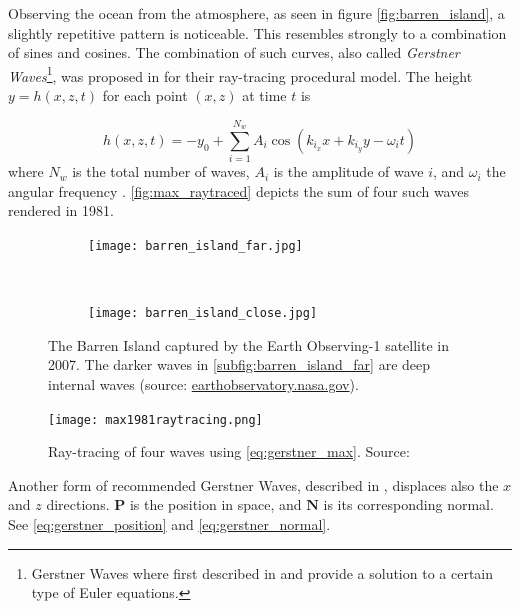 Observing the ocean from the atmosphere, as seen in figure
\autoref{fig:barren_island}, a slightly repetitive pattern is noticeable. This
resembles strongly to a combination of sines and cosines. The combination of
such curves, also called \textit{Gerstner Waves}\footnote{Gerstner Waves where
    first described in \autocite{gerstner1802theorie} and provide a solution to
a certain type of Euler equations.}, was proposed in
\autocite{max1981vectorized} for their ray-tracing procedural model. The height
$y = h(x,z,t)$ for each point $(x,z)$ at time $t$ is

\begin{equation}\label{eq:gerstner_max}
    h(x, z, t) = -y_0 + \sum_{i = 1}^{N_w} A_i \cos(k_{i_x}x + k_{i_y}y -
    \omega_i t)
\end{equation}
%
where $N_w$ is the total number of waves, $A_i$ is the amplitude of wave $i$,
and $\omega_i$ the angular frequency
\autocite{max1981vectorized,darles2011survey}. \autoref{fig:max_raytraced}
depicts the sum of four such waves rendered in 1981.

\begin{figure}[h!]
    \centering
    \begin{subfigure}[h]{\textwidth}
        \centering
        \texttt{[image: barren\_island\_far.jpg]}
        \label{subfig:barren_island_far}
    \end{subfigure}\\%
    \begin{subfigure}[h]{\textwidth}
        \centering
        \texttt{[image: barren\_island\_close.jpg]}
        \label{subfig:barren_island_close}
    \end{subfigure}
    \caption{The Barren Island captured by the Earth Observing-1 satellite in
        2007. The darker waves in \autoref{subfig:barren_island_far} are
        deep internal waves (source:
        \url{earthobservatory.nasa.gov}).}\label{fig:barren_island}
\end{figure}

\begin{figure}[h]
    \centering
    \texttt{[image: max1981raytracing.png]}
    \caption{Ray-tracing of four waves using \autoref{eq:gerstner_max}. Source:
    \autocite{max1981vectorized}}\label{fig:max_raytraced}
\end{figure}

Another form of recommended Gerstner Waves, described in
\autocite[Chapter~1]{fernando2004gpu}, displaces also the $x$ and $z$
directions. $\textbf{P}$ is the position in space, and $\textbf{N}$ is its
corresponding normal. See \autoref{eq:gerstner_position} and
\autoref{eq:gerstner_normal}.

